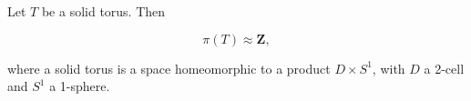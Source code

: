 Let $T$ be a solid torus. Then

$$\pi(T) \approx \mathbf{Z},$$

where a solid torus is a space homeomorphic to a product $D \times S^1$, with $D$ a 2-cell and $S^1$ a 1-sphere.
